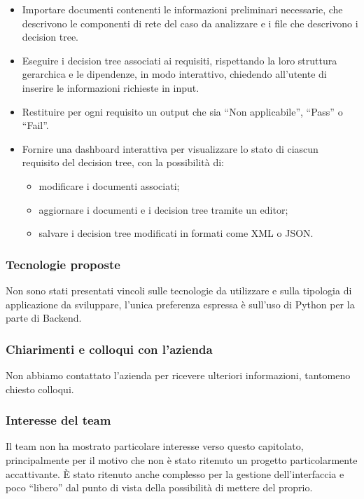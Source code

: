 \documentclass[a4paper,11pt]{article}
\begin{document}
\begin{itemize}[leftmargin=*]
    \item Importare documenti contenenti le informazioni preliminari necessarie, che descrivono le componenti di rete del caso da analizzare e i file che descrivono i decision tree.
    \item Eseguire i decision tree associati ai requisiti, rispettando la loro struttura gerarchica e le dipendenze, in modo interattivo, chiedendo all'utente di inserire le informazioni richieste in input.
    \item Restituire per ogni requisito un output che sia ``Non applicabile'', ``Pass'' o ``Fail''.
    \item Fornire una dashboard interattiva per visualizzare lo stato di ciascun requisito del decision tree, con la possibilità di:
    \begin{itemize}[leftmargin=*]
        \item modificare i documenti associati;  
        \item aggiornare i documenti e i decision tree tramite un editor;  
        \item salvare i decision tree modificati in formati come XML o JSON.
    \end{itemize}
\end{itemize}
\subsubsection{Tecnologie proposte}
Non sono stati presentati vincoli sulle tecnologie da utilizzare e sulla tipologia di applicazione da sviluppare, l'unica preferenza espressa è sull'uso di Python per la parte di Backend.
\subsubsection{Chiarimenti e colloqui con l'azienda}
Non abbiamo contattato l'azienda per ricevere ulteriori informazioni, tantomeno chiesto colloqui.
\subsubsection{Interesse del team}
Il team non ha mostrato particolare interesse verso questo capitolato, principalmente per il motivo che non è stato ritenuto un progetto particolarmente accattivante. È stato ritenuto anche complesso per la gestione dell'interfaccia e poco “libero” dal punto di vista della possibilità di mettere del proprio.
\end{document}
